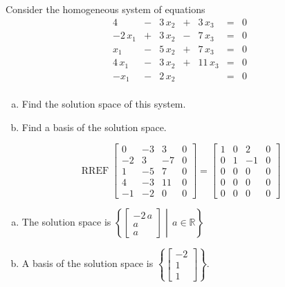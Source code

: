 
\begin{exerciseStatement}


Consider the homogeneous system of equations 
\begin{alignat*}{4}  &-& 3 \, x_{2} &+& 3 \, x_{3} &=& 0 \\-2 \, x_{1} &+& 3 \, x_{2} &-& 7 \, x_{3} &=& 0 \\x_{1} &-& 5 \, x_{2} &+& 7 \, x_{3} &=& 0 \\4 \, x_{1} &-& 3 \, x_{2} &+& 11 \, x_{3} &=& 0 \\-x_{1} &-& 2 \, x_{2} & &  &=& 0 \\ \end{alignat*}
            


\begin{enumerate}[(a)]
\item  Find the solution space of this system.
\item  Find a basis of the solution space.
\end{enumerate}
    
\end{exerciseStatement}
    
\begin{exerciseAnswer} 


\[\operatorname{RREF} \left[\begin{array}{ccc|c}
0 & -3 & 3 & 0 \\
-2 & 3 & -7 & 0 \\
1 & -5 & 7 & 0 \\
4 & -3 & 11 & 0 \\
-1 & -2 & 0 & 0
\end{array}\right] = \left[\begin{array}{ccc|c}
1 & 0 & 2 & 0 \\
0 & 1 & -1 & 0 \\
0 & 0 & 0 & 0 \\
0 & 0 & 0 & 0 \\
0 & 0 & 0 & 0
\end{array}\right] \]


\begin{enumerate}[(a)]
\item The solution space is \( \left\{ \left[\begin{array}{c}
-2 \, a \\
a \\
a
\end{array}\right] \middle|\,a\in\mathbb{R}\right\} \)
\item A basis of the solution space is \( \left\{ \left[\begin{array}{c}
-2 \\
1 \\
1
\end{array}\right] \right\} \).
\end{enumerate}
    
\end{exerciseAnswer}
    
